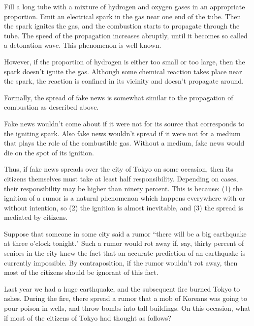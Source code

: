 \documentclass[11pt,a4j,twocolumn]{jarticle}
\makeatletter
\def\section{\@startsection {section}{1}{\z@}{-2ex}{2ex}{\bf}}
\makeatother
\begin{document}
\section{Torahiko Terada wrote in 1924:}

Fill a long tube with a mixture of hydrogen and oxygen gases in an appropriate proportion.
Emit an electrical spark in the gas near one end of the tube.
Then the spark ignites the gas, and the combustion starts to propagate through the tube.
The speed of the propagation increases abruptly, until it becomes so called a detonation wave.
This phenomenon is well known.

However, if the proportion of hydrogen is either too small or too large,
then the spark doesn't ignite the gas.
Although some chemical reaction takes place near the spark,
the reaction is confined in its vicinity and doesn't propagate around.

Formally, the spread of fake news is somewhat similar to 
the propagation of combustion as described above.

Fake news wouldn't come about if it were not for its source that corresponds to the igniting spark.
Also fake news wouldn't spread if it were not for a medium that plays the role of the combustible gas.
Without a medium, fake news would die on the spot of its ignition.

Thus, if fake news spreads over the city of Tokyo on some occasion,
then its citizens themselves must take at least half responsibility.
Depending on cases, their responsibility may be higher than ninety percent.
This is because: (1) the ignition of a rumor is a natural phenomenon which
happens everywhere with or without intention, so (2) the ignition is almost inevitable,
and (3) the spread is mediated by citizens.

Suppose that someone in some city said a rumor 
``there will be a big earthquake at three o'clock tonight."
Such a rumor would rot away if, say, thirty percent of seniors in the city
knew the fact that an accurate prediction of an earthquake is currently impossible.
By contraposition, if the rumor wouldn't rot away, then most of the citizens
should be ignorant of this fact.

Last year we had a huge earthquake, and the subsequent fire burned Tokyo to ashes.
During the fire, there spread a rumor that a mob of Koreans was going to pour poison in wells,
and throw bombs into tall buildings.
On this occasion, what if most of the citizens of Tokyo had thought as follows?
\end{document}
